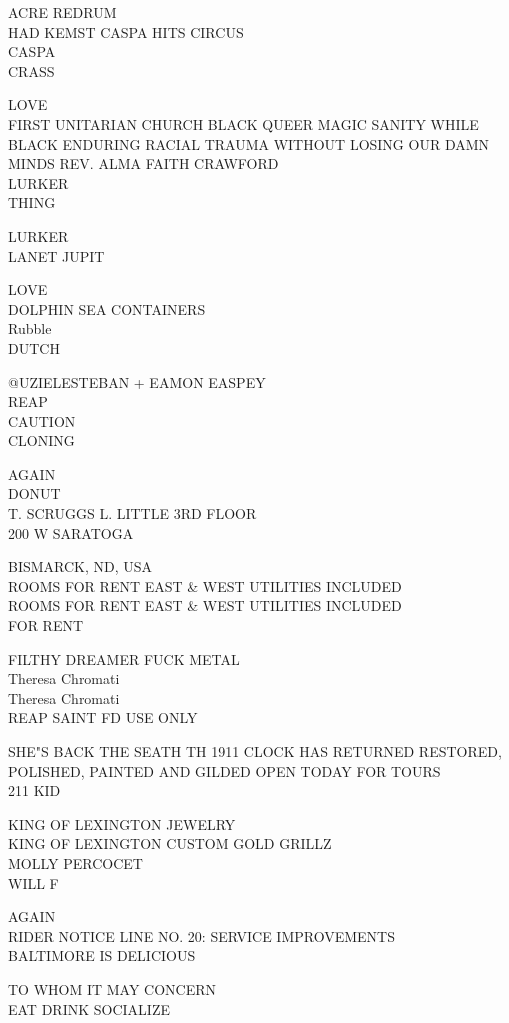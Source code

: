 \documentclass[10pt,letterpaper]{article}
\begin{document}
ACRE REDRUM\\
HAD KEMST CASPA HITS CIRCUS\\
CASPA\\
CRASS

LOVE\\
FIRST UNITARIAN CHURCH BLACK QUEER MAGIC SANITY WHILE BLACK ENDURING RACIAL TRAUMA WITHOUT LOSING OUR DAMN MINDS REV. ALMA FAITH CRAWFORD\\
LURKER\\
THING

LURKER\\
LANET JUPIT

LOVE\\
DOLPHIN SEA CONTAINERS\\
Rubble\\
DUTCH

@UZIELESTEBAN + EAMON EASPEY\\
REAP\\
CAUTION\\
CLONING

AGAIN\\
DONUT\\
T. SCRUGGS L. LITTLE 3RD FLOOR\\
200 W SARATOGA

BISMARCK, ND, USA\\
ROOMS FOR RENT EAST \& WEST UTILITIES INCLUDED\\
ROOMS FOR RENT EAST \& WEST UTILITIES INCLUDED\\
FOR RENT

FILTHY DREAMER FUCK METAL\\
Theresa Chromati\\
Theresa Chromati\\
REAP SAINT FD USE ONLY

SHE"S BACK THE SEATH TH 1911 CLOCK HAS RETURNED RESTORED, POLISHED, PAINTED AND GILDED OPEN TODAY FOR TOURS\\
211 KID

KING OF LEXINGTON JEWELRY\\
KING OF LEXINGTON CUSTOM GOLD GRILLZ\\
MOLLY PERCOCET\\
WILL F

AGAIN\\
RIDER NOTICE LINE NO. 20: SERVICE IMPROVEMENTS\\
BALTIMORE IS DELICIOUS

TO WHOM IT MAY CONCERN\\
EAT DRINK SOCIALIZE
\end{document}
